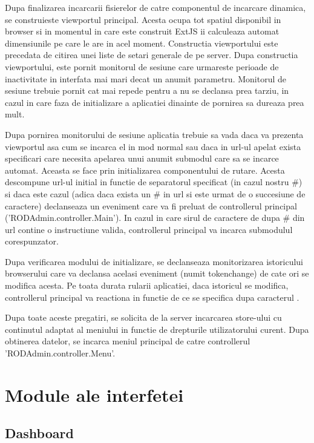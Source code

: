 Dupa finalizarea incarcarii fisierelor de catre componentul de incarcare dinamica, se construieste viewportul principal. Acesta ocupa tot spatiul disponibil in browser si in momentul in care este construit ExtJS ii calculeaza automat dimensiunile pe care le are in acel moment. Constructia viewportului este precedata de citirea unei liste de setari generale de pe server. Dupa constructia viewportului, este pornit monitorul de sesiune care urmareste perioade de inactivitate in interfata mai mari decat un anumit parametru. Monitorul de sesiune trebuie pornit cat mai repede pentru a nu se declansa prea tarziu, in cazul in care faza de initializare a aplicatiei dinainte de pornirea sa dureaza prea mult. 

Dupa pornirea monitorului de sesiune aplicatia trebuie sa vada daca va prezenta viewportul asa cum se incarca el in mod normal sau daca in url-ul apelat exista specificari care necesita apelarea unui anumit submodul care sa se incarce automat. Aceasta se face prin initializarea componentului de rutare. Acesta descompune url-ul initial in functie de separatorul specificat (in cazul nostru \#) si daca este cazul (adica daca exista un \# in url si este urmat de o succesiune de caractere) declanseaza un eveniment care va fi preluat de controllerul principal ('RODAdmin.controller.Main'). In cazul in care sirul de caractere de dupa \# din url contine o instructiune valida, controllerul principal va incarca submodulul corespunzator. 

Dupa verificarea modului de initializare, se declanseaza monitorizarea istoricului browserului care va declansa acelasi eveniment (numit tokenchange) de cate ori se modifica acesta. Pe toata durata rularii aplicatiei, daca istoricul se modifica, controllerul principal va reactiona in functie de ce se specifica dupa caracterul . 

Dupa toate aceste pregatiri, se solicita de la server incarcarea store-ului cu continutul adaptat al meniului in functie de drepturile utilizatorului curent. Dupa obtinerea datelor, se incarca meniul principal de catre controllerul 'RODAdmin.controller.Menu'. 

\section{Module ale interfetei}

\subsection{Dashboard}

